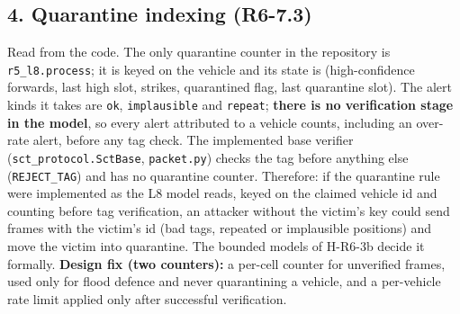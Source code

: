 \subsection*{4. Quarantine indexing (R6-7.3)}

Read from the code. The only quarantine counter in the repository is \texttt{r5\_l8.process}; it is keyed on the vehicle and its state is (high-confidence forwards, last high slot, strikes, quarantined flag, last quarantine slot). The alert kinds it takes are \texttt{ok}, \texttt{implausible} and \texttt{repeat}; \textbf{there is no verification stage in the model}, so every alert attributed to a vehicle counts, including an over-rate alert, before any tag check. The implemented base verifier (\texttt{sct\_protocol.SctBase}, \texttt{packet.py}) checks the tag before anything else (\texttt{REJECT\_TAG}) and has no quarantine counter. Therefore: if the quarantine rule were implemented as the L8 model reads, keyed on the claimed vehicle id and counting before tag verification, an attacker without the victim's key could send frames with the victim's id (bad tags, repeated or implausible positions) and move the victim into quarantine. The bounded models of H-R6-3b decide it formally. \textbf{Design fix (two counters):} a per-cell counter for unverified frames, used only for flood defence and never quarantining a vehicle, and a per-vehicle rate limit applied only after successful verification.

